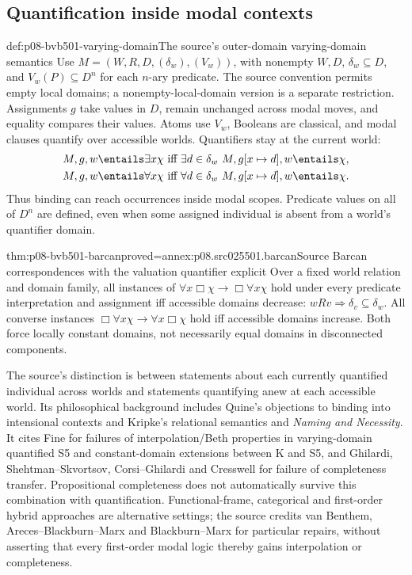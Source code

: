\subsection{Quantification inside modal contexts}
\label{sec:p08-bvb501-first-order-modal}

\begin{hbdefinition}{def:p08-bvb501-varying-domain}{The source's outer-domain varying-domain semantics}
Use \(M=(W,R,D,(\delta_w),(V_w))\), with nonempty \(W,D\),
\(\delta_w\subseteq D\), and \(V_w(P)\subseteq D^n\)
for each \(n\)-ary predicate. The source convention permits empty
local domains; a nonempty-local-domain version is a separate restriction.
Assignments \(g\) take values in \(D\), remain unchanged across
modal moves, and equality compares their values. Atoms use \(V_w\),
Booleans are classical, and modal clauses quantify over accessible
worlds. Quantifiers stay at the current world:
\[
 \begin{aligned}
 M,g,w\entails\exists x\chi&\ \text{iff}\ 
   \exists d\in\delta_w\ M,g[x\mapsto d],w\entails\chi,\\
 M,g,w\entails\forall x\chi&\ \text{iff}\ 
   \forall d\in\delta_w\ M,g[x\mapsto d],w\entails\chi.
 \end{aligned}
\]
Thus binding can reach occurrences inside modal scopes. Predicate
values on all of \(D^n\) are defined, even when some assigned
individual is absent from a world's quantifier domain.
\end{hbdefinition}

\begin{hbtheorem}{thm:p08-bvb501-barcan}{proved=annex:p08.src025501.barcan}{Source Barcan correspondences with the valuation quantifier explicit}
Over a fixed world relation and domain family, all instances of
\(\forall x\Box\chi\to\Box\forall x\chi\) hold under
every predicate interpretation and assignment iff accessible domains
decrease: \(wRv\Rightarrow\delta_v\subseteq\delta_w\).
All converse instances \(\Box\forall x\chi\to\forall x\Box\chi\)
hold iff accessible domains increase. Both force locally constant domains,
not necessarily equal domains in disconnected components.
\end{hbtheorem}

The source's distinction is between statements about each currently
quantified individual across worlds and statements quantifying anew at
each accessible world. Its philosophical background includes Quine's
objections to binding into intensional contexts and Kripke's relational
semantics and \emph{Naming and Necessity}. It cites Fine for failures of
interpolation/Beth properties in varying-domain quantified S5 and
constant-domain extensions between K and S5, and Ghilardi,
Shehtman--Skvortsov, Corsi--Ghilardi and Cresswell for failure of
completeness transfer. Propositional completeness does not automatically
survive this combination with quantification. Functional-frame,
categorical and first-order hybrid approaches are alternative settings;
the source credits van Benthem, Areces--Blackburn--Marx and
Blackburn--Marx for particular repairs, without asserting that every
first-order modal logic thereby gains interpolation or completeness.

